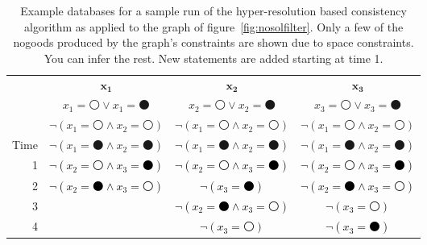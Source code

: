 \begin{SCtable}
  \begin{minipage}{1.0\linewidth}
  \begin{center}
    \begin{tabular}{rccc}\toprule
       & $\mathbf{x_1}$ & $\mathbf{x_2}$ & $\mathbf{x_3}$ \\ \cmidrule{2-4}
       & \phantom{$\neg ($}$x_1 = \medcirc \vee x_1 = \medbullet$\phantom{$)$} &
      \phantom{$\neg ($}$x_2 = \medcirc \vee x_2 = \medbullet$\phantom{$)$} &
      \phantom{$\neg ($}$x_3 = \medcirc \vee x_3 = \medbullet$\phantom{$)$}  \\ 
       & $\neg (x_1 = \medcirc \wedge x_2 = \medcirc)$ &
      $\neg (x_1 = \medcirc \wedge x_2 = \medcirc)$ &
      $\neg (x_1 = \medcirc \wedge x_2 = \medcirc)$   \\ 
      Time & $\neg (x_1 = \medbullet \wedge x_2 = \medbullet)$ &
      $\neg (x_1 = \medbullet \wedge x_2 = \medbullet)$ &
      $\neg (x_1 = \medbullet \wedge x_2 = \medbullet)$ \\ \midrule
      1 & \textcolor{black}{$\neg(x_2 = \medcirc \wedge x_3 = \medbullet)$} & 
      \textcolor{black}{$\neg(x_2 = \medcirc \wedge x_3 = \medbullet)$} & 
      \textcolor{black}{$\neg(x_2 = \medcirc \wedge x_3 =
        \medbullet)$}\\ 
      2 & \textcolor{black}{$\neg(x_2 = \medbullet \wedge x_3 = \medcirc)$} &
      \textcolor{black}{$\neg(x_3 = \medbullet)$}&
      \textcolor{black}{$\neg(x_2 = \medbullet \wedge x_3 = \medcirc)$}  \\ 
      3 & &
      \textcolor{black}{$\neg(x_2 = \medbullet \wedge x_3 = \medcirc)$}&  
      \textcolor{black}{$\neg(x_3 = \medcirc)$} \\ 
      4 & &
      \textcolor{black}{$\neg(x_3 = \medcirc)$}  &  
      \textcolor{black}{$\neg(x_3 = \medbullet)$} \\ \bottomrule
    \end{tabular}
  \end{center}
  \end{minipage}
  \caption{Example databases for a sample run of the hyper-resolution
    based consistency algorithm as applied to the graph of
    figure~\ref{fig:nosolfilter}. Only a few of the nogoods produced
    by the graph's constraints are shown due to space constraints. You
    can infer the rest. New statements are added starting at time 1.}
  \label{tab:hyperex}
\end{SCtable}
